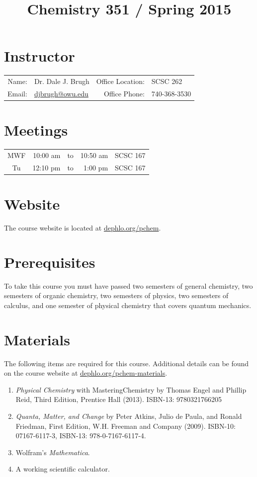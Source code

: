 \documentclass[letterpaper,oneside,onecolumn,11pt,article]{memoir}
\title{Chemistry 351 / Spring 2015}
\date{}
\author{}
\begin{document}
\maketitle
\thispagestyle{courseinformationtitle}
%
%
\section{Instructor}
\begin{tabular}{rl|rl}
Name: & Dr. Dale J. Brugh & Office Location: & SCSC 262 \\
Email: & \href{mailto:djbrugh@owu.edu}{djbrugh@owu.edu} & Office Phone: & 740-368-3530 \\
\end{tabular}
%
%
\section{Meetings}
\begin{tabular}{crcrl}
MWF & 10:00 am & to & 10:50 am & SCSC 167\\
Tu & 12:10 pm & to & 1:00 pm & SCSC 167 \\
\end{tabular}
%
%
\section{Website}
The course website is located at \href{http://dephlo.org/pchem}{dephlo.org/pchem}.
%
%
\section{Prerequisites}
To take this course you must have passed two semesters of general chemistry, two semesters of organic chemistry, two semesters of physics, two semesters of calculus, and one semester of physical chemistry that covers quantum mechanics.
%
%
\section{Materials}
The following items are required for this course. Additional details can be found on the course website at \href{http://dephlo.org/pchem-materials}{dephlo.org/pchem-materials}.
\begin{enumerate}
\item \emph{Physical Chemistry} with MasteringChemistry by Thomas Engel and Phillip Reid, Third Edition, Prentice Hall (2013).  ISBN-13: 9780321766205
\item \emph{Quanta, Matter, and Change} by Peter Atkins, Julio de Paula, and Ronald Friedman, First Edition, W.H. Freeman and Company (2009). ISBN-10: 07167-6117-3, ISBN-13: 978-0-7167-6117-4.
\item Wolfram's \emph{Mathematica}.
\item A working scientific calculator.
\end{enumerate}
%
%
\end{document}
